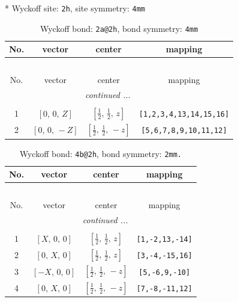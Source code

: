 \documentclass[fleqn,8pt]{jsarticle}
\begin{document}
* Wyckoff site: {\tt 2h}, site symmetry: {\tt 4mm}
\renewcommand{\arraystretch}{1.2}
\begin{longtable}{cccc}
\caption{Wyckoff bond: {\tt 2a@2h}, bond symmetry: {\tt 4mm}}
 \\
 \hline \hline
No. & vector & center & mapping \\ \hline \endfirsthead

\multicolumn{3}{l}{\tablename\ \thetable{}} \\
 \hline \hline
No. & vector & center & mapping \\ \hline \endhead

 \hline \hline
\multicolumn{3}{r}{\footnotesize\it continued ...} \\ \endfoot

 \hline \hline
\multicolumn{3}{r}{} \\ \endlastfoot

1 & $\left[ 0,\, 0,\, Z \right]$ & $\left[ \frac{1}{2},\, \frac{1}{2},\, z \right]$ & {\tt [1,2,3,4,13,14,15,16]} \\ \hline
2 & $\left[ 0,\, 0,\, - Z \right]$ & $\left[ \frac{1}{2},\, \frac{1}{2},\, - z \right]$ & {\tt [5,6,7,8,9,10,11,12]} \\
\end{longtable}
\renewcommand{\arraystretch}{1.2}
\begin{longtable}{cccc}
\caption{Wyckoff bond: {\tt 4b@2h}, bond symmetry: {\tt 2mm.}}
 \\
 \hline \hline
No. & vector & center & mapping \\ \hline \endfirsthead

\multicolumn{3}{l}{\tablename\ \thetable{}} \\
 \hline \hline
No. & vector & center & mapping \\ \hline \endhead

 \hline \hline
\multicolumn{3}{r}{\footnotesize\it continued ...} \\ \endfoot

 \hline \hline
\multicolumn{3}{r}{} \\ \endlastfoot

1 & $\left[ X,\, 0,\, 0 \right]$ & $\left[ \frac{1}{2},\, \frac{1}{2},\, z \right]$ & {\tt [1,-2,13,-14]} \\ \hline
2 & $\left[ 0,\, X,\, 0 \right]$ & $\left[ \frac{1}{2},\, \frac{1}{2},\, z \right]$ & {\tt [3,-4,-15,16]} \\ \hline
3 & $\left[ - X,\, 0,\, 0 \right]$ & $\left[ \frac{1}{2},\, \frac{1}{2},\, - z \right]$ & {\tt [5,-6,9,-10]} \\ \hline
4 & $\left[ 0,\, X,\, 0 \right]$ & $\left[ \frac{1}{2},\, \frac{1}{2},\, - z \right]$ & {\tt [7,-8,-11,12]} \\
\end{longtable}
\end{document}
